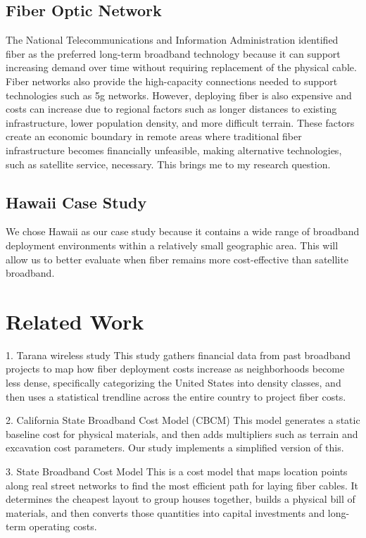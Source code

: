 \documentclass[conference]{IEEEtran}
\begin{document}
\subsection{Fiber Optic Network}
The National Telecommunications and Information Administration identified fiber as the preferred long-term broadband technology because it can support increasing demand over time without requiring replacement of the physical cable. Fiber networks also provide the high-capacity connections needed to support technologies such as 5g networks.\cite{NTIA2022BEAD_NOFO}
However, deploying fiber is also expensive and costs can increase due to regional factors such as longer distances to existing infrastructure, lower population density, and more difficult terrain. These factors create an economic boundary in remote areas where traditional fiber infrastructure becomes financially unfeasible, making alternative technologies, such as satellite service, necessary. This brings me to my research question.

\subsection{Hawaii Case Study}

We chose Hawaii as our case study because it contains a wide range of broadband deployment environments within a relatively small geographic area. This will allow us to better evaluate when fiber remains more cost-effective than satellite broadband.


\section{Related Work}

1. Tarana wireless study
This study gathers financial data from past broadband projects to map how fiber deployment costs increase as neighborhoods become less dense, specifically categorizing the United States into density classes, and then uses a statistical trendline across the entire country to project fiber costs.

2. California State Broadband Cost Model (CBCM)
This model generates a static baseline cost for physical materials, and then adds multipliers such as terrain and excavation cost parameters. Our study implements a simplified version of this.

3. State Broadband Cost Model
This is a cost model that maps location points along real street networks to find the most efficient path for laying fiber cables. It determines the cheapest layout to group houses together, builds a physical bill of materials, and then converts those quantities into capital investments and long-term operating costs.
\end{document}
